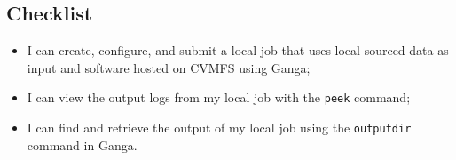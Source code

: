 \subsection{Checklist}
\label{sec:localrunning-checklist}

\begin{itemize}
\tightlist
\item
  I can create, configure, and submit a local job that uses
  local-sourced data as input and software hosted on CVMFS using Ganga;
\item
  I can view the output logs from my local job with the \texttt{peek}
  command;
\item
  I can find and retrieve the output of my local job using the
  \texttt{outputdir} command in Ganga.
\end{itemize}
